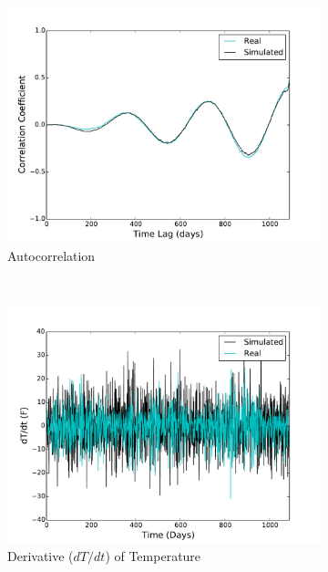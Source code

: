 \documentclass[11pt, letterpaper]{article}
\begin{document}
\begin{figure}[H]
\begin{subfigure}[b]{0.45\textwidth}
    \includegraphics[width=\textwidth]{figures/sim_temp_autocorr.pdf}
    \caption{\label{fig:analysis-autocorr} Autocorrelation}
  \end{subfigure}
  ~
  \begin{subfigure}[b]{0.45\textwidth}
    \includegraphics[width=\textwidth]{figures/sim_vel.pdf}
    \caption{\label{fig:analysis-autocorr} Derivative ($dT/dt$) of Temperature}
  \end{subfigure}
  ~
  \begin{subfigure}[b]{0.45\textwidth}

\end{subfigure}
\end{figure}
\end{document}
